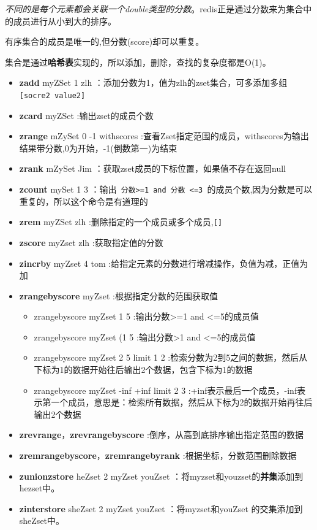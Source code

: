 \documentclass[UTF8,a4paper,12pt]{ctexbook}
\begin{document}
		\textit{不同的是每个元素都会关联一个double类型的分数}。redis正是通过分数来为集合中的成员进行从小到大的排序。
		
		有序集合的成员是唯一的,但分数(score)却可以重复。
		
		集合是通过\textbf{哈希表}实现的，所以添加，删除，查找的复杂度都是O(1)。
		\begin{itemize}
			\item \textbf{zadd} myZSet 1 zlh   ：添加分数为1，值为zlh的zset集合，可多添加多组\verb|[socre2 value2]|
			\item \textbf{zcard} myZSet   :输出zset的成员个数
			\item \textbf{zrange} mZySet 0 -1 withscores :查看Zset指定范围的成员，withscores为输出结果带分数,0为开始，-1(倒数第一)为结束
			\item \textbf{zrank} mZySet Jim ：获取zset成员的下标位置，如果值不存在返回null
			\item \textbf{zcount} mySet 1 3 ：输出\verb| 分数>=1 and 分数 <=3 |的成员个数,因为分数是可以重复的，所以这个命令是有道理的
			\item \textbf{zrem} myZSet zlh :删除指定的一个成员或多个成员,\verb|[]|
			\item \textbf{zscore} myZset zlh :获取指定值的分数
			\item \textbf{zincrby} myZset 4 tom :给指定元素的分数进行增减操作，负值为减，正值为加
			\item \textbf{zrangebyscore} myZset :根据指定分数的范围获取值
				\begin{itemize}
					\item zrangebyscore myZset  1 5  :输出分数>=1 and <=5的成员值
					\item zrangebyscore myZset  (1 5  :输出分数>1 and <=5的成员值
					\item zrangebyscore myZset 2 5 limit 1 2  :检索分数为2到5之间的数据，然后从下标为1的数据开始往后输出2个数据，包含下标为1的数据
					\item zrangebyscore myZset -inf +inf limit 2 3 :+inf表示最后一个成员，-inf表示第一个成员，意思是：检索所有数据，然后从下标为2的数据开始再往后输出2个数据
				\end{itemize}
			\item \textbf{zrevrange}，\textbf{zrevrangebyscore} :倒序，从高到底排序输出指定范围的数据
			\item \textbf{zremrangebyscore}，\textbf{zremrangebyrank} :根据坐标，分数范围删除数据
			\item \textbf{zunionzstore} heZset 2 myZset youZset  ：将myzset和youzset的\textbf{并集}添加到hezset中。
			\item \textbf{zinterstore} sheZset 2 myZset youZset  ：将myzset和youZset 的交集添加到sheZset中。
		\end{itemize}
\end{document}
